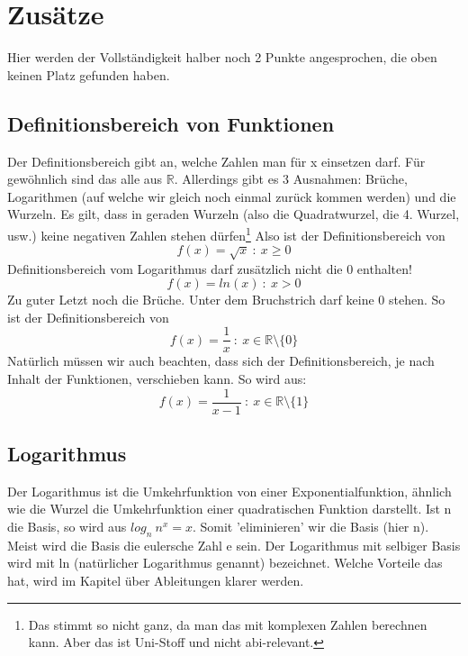\section{Zusätze}
	Hier werden der Vollständigkeit halber noch 2 Punkte angesprochen, die oben
	keinen Platz gefunden haben.

	\subsection{Definitionsbereich von Funktionen}
		Der Definitionsbereich gibt an, welche Zahlen man für x einsetzen darf. Für
		gewöhnlich sind das alle aus \(\mathbb{R}\). Allerdings gibt es 3 Ausnahmen:
		Brüche, Logarithmen (auf welche wir gleich noch einmal zurück kommen werden)
		und die Wurzeln. Es gilt, dass in geraden Wurzeln (also die Quadratwurzel, die
		4. Wurzel, usw.) keine negativen Zahlen stehen dürfen\footnote{Das stimmt so
		nicht ganz, da man das mit komplexen Zahlen berechnen kann. Aber das ist
		Uni-Stoff und nicht abi-relevant.} Also ist der Definitionsbereich von
		\[f(x)=\sqrt{x}\ :\ x\geq 0\]
		Definitionsbereich vom Logarithmus darf	zusätzlich nicht die 0 enthalten!
		\[f(x)=ln(x)\ :\ x>0\]
		Zu guter Letzt noch die Brüche. Unter dem Bruchstrich darf keine 0 stehen. So
		ist der Definitionsbereich von
		\[f(x)=\frac{1}{x}\ :\ x\in\mathbb{R}\setminus\{0\}\]
		Natürlich müssen wir auch beachten, dass sich der Definitionsbereich, je nach
		Inhalt der Funktionen, verschieben kann. So wird aus:
		\[f(x)=\frac{1}{x-1}\ :\ x\in\mathbb{R}\setminus\{1\}\]
	
	\subsection{Logarithmus}
		Der Logarithmus ist die Umkehrfunktion von einer Exponentialfunktion, ähnlich
		wie die Wurzel die Umkehrfunktion einer quadratischen Funktion darstellt. Ist
		n die Basis, so wird aus \(log_n\ n^x=x\). Somit 'eliminieren' wir die Basis
		(hier n). Meist wird die Basis die eulersche Zahl e sein. Der Logarithmus mit
		selbiger Basis wird mit ln (natürlicher Logarithmus genannt) bezeichnet.
		Welche Vorteile das hat, wird im Kapitel über Ableitungen klarer werden.
